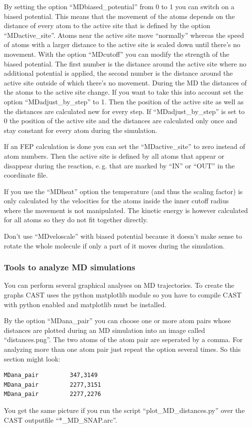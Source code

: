 \documentclass[10pt,a4paper]{article} %
\begin{document}
	By setting the option ``MDbiased\_potential'' from 0 to 1 you can switch on a biased potential. This means that the movement of the atoms depends on the distance of every atom to the active site that is defined by the option ``MDactive\_site''. Atoms near the active site move ``normally'' whereas the speed of atoms with a larger distance to the active site is scaled down until there's no movement. With the option ``MDcutoff'' you can modify the strength of the biased potential. The first number is the distance around the active site where no additional potential is applied, the second number is the distance around the active site outside of which there's no movement. During the MD the distances of the atoms to the active site change. If you want to take this into account set the option ``MDadjust\_by\_step'' to 1. Then the position of the active site as well as the distances are calculated new for every step. If ``MDadjust\_by\_step'' is set to 0 the position of the active site and the distances are calculated only once and stay constant for every atom during the simulation. 
	
If an FEP calculation is done you can set the ``MDactive\_site'' to zero instead of atom numbers. Then the active site is defined by all atoms that appear or disappear during the reaction, e.\,g. that are marked by ``IN'' or ``OUT'' in the coordinate file. 
	
If you use the ``MDheat'' option the temperature (and thus the scaling factor) is only calculated by the velocities for the atoms inside the inner cutoff radius where the movement is not manipulated. The kinetic energy is however calculated for all atoms so they do not fit together directly. 

Don't use ``MDveloscale'' with biased potential because it doesn't make sense to rotate the whole molecule if only a part of it moves during the simulation.

\subsubsection{Tools to analyze MD simulations}

You can perform several graphical analyses on MD trajectories. To create the graphs CAST uses the python matplotlib module so you have to compile CAST with python enabled and matplotlib must be installed.

By the option ``MDana\_pair'' you can choose one or more atom pairs whose distances are plotted during an MD simulation into an image called ``distances.png''. The two atoms of the atom pair are seperated by a comma. For analyzing more than one atom pair just repeat the option several times. So this section might look: 
			\begin{lstlisting}
MDana_pair         347,3149
MDana_pair         2277,3151
MDana_pair         2277,2276
	\end{lstlisting}
	You get the same picture if you run the script ``plot\_MD\_distances.py'' over the CAST outputfile ``*\_MD\_SNAP.arc''.
	
\end{document}
